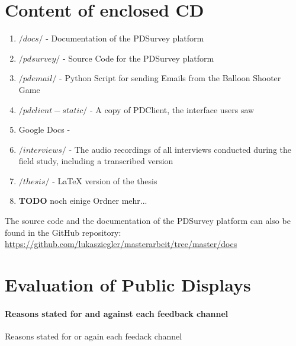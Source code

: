 \section{Content of enclosed CD}
\label{appendix:cd-contents}


    \begin{enumerate}
    \item $/docs/$ - Documentation of the PDSurvey platform
    \item $/pdsurvey/$ - Source Code for the PDSurvey platform
    \item $/pdemail/$ - Python Script for sending Emails from the Balloon Shooter Game
    \item $/pdclient-static/$ - A copy of PDClient, the interface users saw
    \item Google Docs - 
    \item $/interviews/$ - The audio recordings of all interviews conducted during the field study, including a transcribed version
    \item $/thesis/$ - LaTeX version of the thesis
    \item \textbf{TODO} noch einige Ordner mehr...
    \end{enumerate}

  The source code and the documentation of the PDSurvey platform can also be found in the GitHub repository: \url{https://github.com/lukasziegler/masterarbeit/tree/master/docs}



\cleardoublepage
\section{Evaluation of Public Displays}
\label{appendix:evaluation-of-PDs}

  \paragraph{Reasons stated for and against each feedback channel}

  \begin{table}[h]
    
    \caption{Reasons stated for or again each feedack channel}
    \label{table:feedback-channels--pro-con}
  \end{table}



